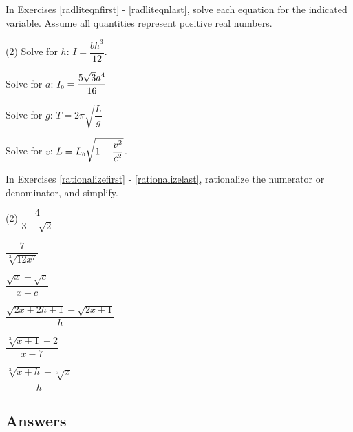 In Exercises \ref{radliteqnfirst} - \ref{radliteqnlast}, solve each equation for the indicated variable.  Assume all quantities represent positive real numbers.

\begin{tasks}[resume](2)
\task Solve for $h$:  $I = \dfrac{bh^3}{12}$.  \label{radliteqnfirst}

\task Solve for $a$:  $I_{\text{\tiny $0$}} = \dfrac{5\sqrt{3} a^4}{16}$

\task Solve for $g$:  $T = 2\pi \sqrt{\dfrac{L}{g}}$

\task Solve for $v$:   $L = L_{\text{\tiny $0$}} \sqrt{1 - \dfrac{v^2}{c^2}}$.  \label{radliteqnlast}

\end{tasks}

In Exercises \ref{rationalizefirst} - \ref{rationalizelast}, rationalize the numerator or denominator, and simplify.


\begin{tasks}[resume](2)
\task   $\dfrac{4}{3 - \sqrt{2}}$  \label{rationalizefirst}

\task  $\dfrac{7}{\sqrt[3]{12x^7}}$

\task   $\dfrac{\sqrt{x} - \sqrt{c}}{x - c}$ 


\task  $\dfrac{\sqrt{2x+2h+1} - \sqrt{2x+1}}{h}$ 

\task  $\dfrac{\sqrt[3]{x+1} - 2}{x- 7}$                                          

\task  $\dfrac{\sqrt[3]{x+h} - \sqrt[3]{x}}{h}$  \label{rationalizelast}

\end{tasks}

\clearpage

\subsection{Answers}

